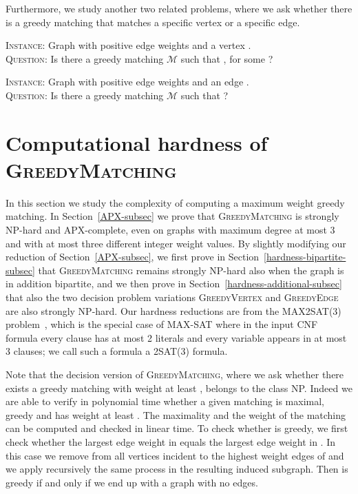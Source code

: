 \documentclass[a4paper,11pt]{article}
\newcommand{\mcal}{\ensuremath{\mathcal{M}}\xspace}
\newcommand{\greedy}{\textsc{GreedyMatching}\xspace}
\newcommand{\greedyv}{\textsc{GreedyVertex}\xspace}
\newcommand{\greedye}{\textsc{GreedyEdge}\xspace}
\begin{document}
\medskip

Furthermore, we study another two related problems, where we ask whether there 
is a greedy matching that matches a specific vertex or a specific edge.

\medskip

\begin{tcolorbox}[title=\greedyv]
\textsc{Instance}: Graph  with positive edge weights and a vertex .\\
\textsc{Question}: Is there a greedy matching \mcal such that ,
for some ?
\end{tcolorbox}

\medskip

\begin{tcolorbox}[title=\greedye]
\textsc{Instance}: Graph  with positive edge weights and an edge .\\
\textsc{Question}: Is there a greedy matching \mcal such that ?
\end{tcolorbox}








\section{Computational hardness of \greedy\label{sec:hardness}}
 In this section we study the complexity of computing a
maximum weight greedy matching. In Section~\ref{APX-subsec} we prove that 
\greedy is strongly NP-hard and
APX-complete, even on graphs with maximum degree at most 3 and with at most
three different integer weight values. By slightly modifying our reduction
of Section~\ref{APX-subsec}, we first prove in Section~\ref {hardness-bipartite-subsec} that \greedy remains
strongly NP-hard also when the graph is in addition bipartite, and we then
prove in Section~\ref{hardness-additional-subsec} that also the two decision problem
variations \greedyv and \greedye are
also strongly NP-hard. Our hardness reductions are from the MAX2SAT(3)
problem~\cite{Ausiello1999,RRR98}, which is the special case of MAX-SAT where in
the input CNF formula  every clause has at most 2 literals and every
variable appears in at most 3 clauses; we call such a formula  a
2SAT(3) formula.



Note that the decision version of \greedy, where we ask whether there exists a 
greedy matching with weight at least , belongs to the class NP. Indeed we are
able to verify in polynomial time whether a given matching  is maximal, 
greedy and has weight at least . The maximality and the weight of 
the matching  can be computed and checked in linear time. 
To check whether  is greedy, we first check whether the largest edge 
weight in  equals the largest edge weight in . In this case we remove 
from  all vertices incident to the highest weight edges of  and we 
apply recursively the same process in the resulting induced subgraph. Then  is greedy if and only if we end up with a graph with no 
edges.
\end{document}
